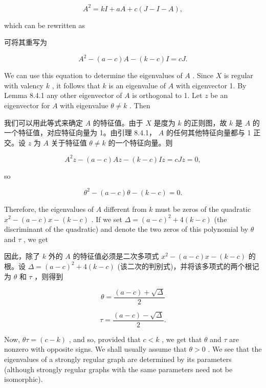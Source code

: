 \documentclass[10pt]{article}
\begin{document}
\[
{A}^{2} = {kI} + {aA} + c\left( {J - I - A}\right) ,
\]

which can be rewritten as

\begin{tcolorbox}\relax
可将其重写为
\end{tcolorbox}

\[
{A}^{2} - \left( {a - c}\right) A - \left( {k - c}\right) I = {cJ}.
\]

We can use this equation to determine the eigenvalues of \(A\) . Since \(X\) is regular with valency \(k\) , it follows that \(k\) is an eigenvalue of \(A\) with eigenvector 1. By Lemma 8.4.1 any other eigenvector of \(A\) is orthogonal to 1. Let \(z\) be an eigenvector for \(A\) with eigenvalue \(\theta  \neq  k\) . Then

\begin{tcolorbox}\relax
我们可以用此等式来确定 \(A\) 的特征值。由于 \(X\) 是度为 \(k\) 的正则图，故 \(k\) 是 \(A\) 的一个特征值，对应特征向量为 1。由引理 8.4.1， \(A\) 的任何其他特征向量都与 1 正交。设 \(z\) 为 \(A\) 关于特征值 \(\theta  \neq  k\) 的一个特征向量。则
\end{tcolorbox}

\[
{A}^{2}z - \left( {a - c}\right) {Az} - \left( {k - c}\right) {Iz} = {cJz} = 0,
\]

so

\[
{\theta }^{2} - \left( {a - c}\right) \theta  - \left( {k - c}\right)  = 0.
\]

Therefore, the eigenvalues of \(A\) different from \(k\) must be zeros of the quadratic \({x}^{2} - \left( {a - c}\right) x - \left( {k - c}\right)\) . If we set \(\Delta  = {\left( a - c\right) }^{2} + 4\left( {k - c}\right)\) (the discriminant of the quadratic) and denote the two zeros of this polynomial by \(\theta\) and \(\tau\) , we get

\begin{tcolorbox}\relax
因此，除了 \(k\) 外的 \(A\) 的特征值必须是二次多项式 \({x}^{2} - \left( {a - c}\right) x - \left( {k - c}\right)\) 的根。设 \(\Delta  = {\left( a - c\right) }^{2} + 4\left( {k - c}\right)\) (该二次的判别式)，并将该多项式的两个根记为 \(\theta\) 和 \(\tau\) ，则得到
\end{tcolorbox}

\[
\theta  = \frac{\left( {a - c}\right)  + \sqrt{\Delta }}{2}
\]

\[
\tau  = \frac{\left( {a - c}\right)  - \sqrt{\Delta }}{2}.
\]

Now, \({\theta \tau } = \left( {c - k}\right)\) , and so, provided that \(c < k\) , we get that \(\theta\) and \(\tau\) are nonzero with opposite signs. We shall usually assume that \(\theta  > 0\) . We see that the eigenvalues of a strongly regular graph are determined by its parameters (although strongly regular graphs with the same parameters need not be isomorphic).
\end{document}
